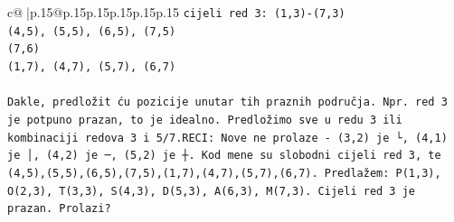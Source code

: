 \documentclass{article}
\begin{document}
{\begin{supertabular}{c@{$\;$}|p{.15\linewidth}@{}p{.15\linewidth}p{.15\linewidth}p{.15\linewidth}p{.15\linewidth}p{.15\linewidth}}
{{{\texttt{cijeli red 3: (1,3){-}(7,3)} \\
\texttt{(4,5), (5,5), (6,5), (7,5)} \\
\texttt{(7,6)} \\
\texttt{(1,7), (4,7), (5,7), (6,7)} \\
\\ 
\texttt{Dakle, predložit ću pozicije unutar tih praznih područja. Npr. red 3 je potpuno prazan, to je idealno. Predložimo sve u redu 3 ili kombinaciji redova 3 i 5/7.RECI: Nove ne prolaze {-} (3,2) je └, (4,1) je │, (4,2) je ─, (5,2) je ┼. Kod mene su slobodni cijeli red 3, te (4,5),(5,5),(6,5),(7,5),(1,7),(4,7),(5,7),(6,7). Predlažem: P(1,3), O(2,3), T(3,3), S(4,3), D(5,3), A(6,3), M(7,3). Cijeli red 3 je prazan. Prolazi?} \\
            }
        }
    }
     \\ \\


\end{supertabular}}
\end{document}
